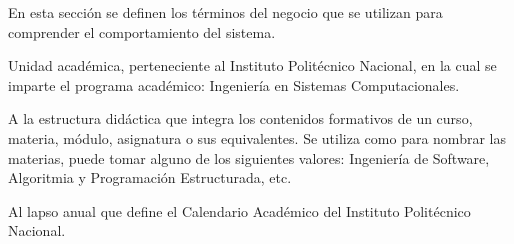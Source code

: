 En esta sección se definen los términos del negocio que se utilizan para comprender el comportamiento del sistema.

\begin{description}
	
	 Unidad académica, perteneciente al Instituto Politécnico Nacional, en la cual se imparte el programa académico: Ingeniería en Sistemas Computacionales.
	
	 A la estructura didáctica que integra los contenidos formativos de un curso, materia, módulo, asignatura o sus equivalentes. Se utiliza como  para nombrar las materias, puede tomar alguno de los siguientes valores: Ingeniería de Software, Algoritmia y Programación Estructurada, etc.
	
	 Al lapso anual que define el Calendario Académico del Instituto Politécnico Nacional.


\end{description}
